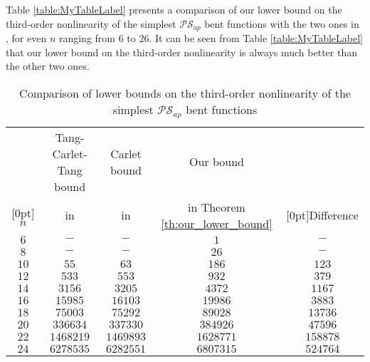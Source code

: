 \documentclass[preprint,10pt]{elsarticle}
\newcommand{\0}{\textbf{0}}
\newcommand{\1}{\textbf{1}}
\theoremstyle{plain}
\begin{document}
    Table \ref{table:MyTableLabel} presents a comparison of our lower bound on the third-order nonlinearity of the simplest $\mathcal{PS}_{ap}$ bent functions with the two ones in \cite{Carlet2011NL_Profile_Dillon,TangCT2013NL_2bent}, for even $n$ ranging from $6$ to $26$.
    It can be seen from Table \ref{table:MyTableLabel} that our lower bound on the third-order nonlinearity is always much better than the other two ones.
 \newcommand{\rb}[1]{\raisebox{1.5ex}[0pt]{#1}}
    \begin{table}
        \centering
        \caption{Comparison of lower bounds on the third-order nonlinearity of the simplest $\mathcal{PS}_{ap}$ bent functions}
        \begin{threeparttable}
            \begin{tabular}{|c|c|c|c|c|}
                \hline
                        & Tang-Carlet-Tang bound      & Carlet bound                            & Our bound& \\
                \rb{$n$}& in \cite{TangCT2013NL_2bent}& in \cite{Carlet2011NL_Profile_Dillon} & in Theorem \ref{th:our_lower_bound}     &\rb{Difference\tnote{1}}   \\
                \hline
                $6  $ &  $ -           $       & $ -        $     & $ 1        $     & $  -       $ \\  \hline
                $8  $ &  $ -           $       & $ -        $     & $ 26       $     & $  -       $ \\  \hline
                $10 $ &  $ 55          $       & $ 63       $     & $ 186      $     & $  123     $ \\  \hline
                $12 $ &  $ 533         $       & $ 553      $     & $ 932      $     & $  379     $ \\  \hline
                $14 $ &  $ 3156        $       & $ 3205     $     & $ 4372     $     & $  1167    $ \\  \hline
                $16 $ &  $ 15985       $       & $ 16103    $     & $ 19986    $     & $  3883    $ \\  \hline
                $18 $ &  $ 75003       $       & $ 75292    $     & $ 89028    $     & $  13736   $ \\  \hline
                $20 $ &  $ 336634      $       & $ 337330   $     & $ 384926   $     & $  47596   $ \\  \hline
                $22 $ &  $ 1468219     $       & $ 1469893  $     & $ 1628771  $     & $  158878  $ \\  \hline
                $24 $ &  $ 6278535     $       & $ 6282551  $     & $ 6807315  $     & $  524764  $ \\  \hline

\end{tabular}
\end{threeparttable}
\end{table}
\end{document}
